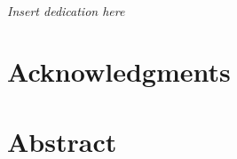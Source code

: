 \clearpage


\begingroup
\centering
{}
~
\\[1in]
\textit{Insert dedication here}
\par
\endgroup

\clearpage


\chapter*{Acknowledgments}

\clearpage


\chapter*{Abstract}


\clearpage


\tableofcontents

\listoffigures

\listoftables

\clearpage

